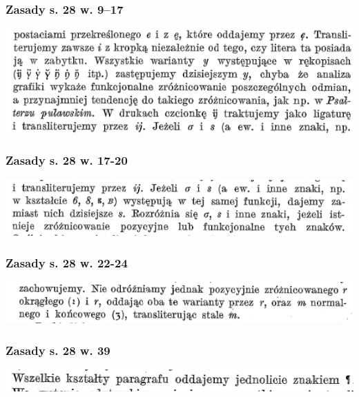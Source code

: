 \documentclass[pdfpagemode=UseNone]{beamer}
\begin{document}
\begin{frame}
  \frametitle{Zasady s. 28 w. 9--17}
  \includegraphics[width=\hsize]{img/Zasady28_9-17}

\end{frame}

\begin{frame}
  \frametitle{Zasady s. 28 w. 17-20}
  \includegraphics[width=\hsize]{img/Zasady28_17-20}

\end{frame}

\begin{frame}
  \frametitle{Zasady s. 28 w. 22-24}
  \includegraphics[width=\hsize]{img/Zasady28_22-24}

\end{frame}

\begin{frame}
  \frametitle{Zasady s. 28 w. 39}
  \includegraphics[width=\hsize]{img/Zasady28_39}

\end{frame}
\end{document}
